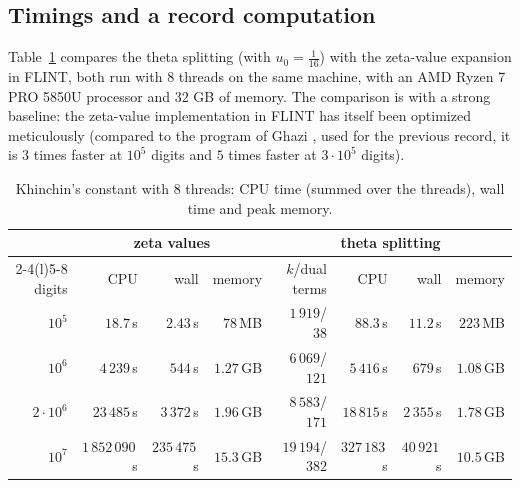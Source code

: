 \documentclass[11pt,reqno]{amsart}
\theoremstyle{definition}
\theoremstyle{remark}
\begin{document}
\subsection{Timings and a record computation}\label{sec:khresults}
Table~\ref{tab:khinchin} compares the theta splitting (with $u_0 = \frac1{16}$) with the zeta-value expansion in FLINT,
both run with $8$ threads on the same machine, with an AMD Ryzen 7 PRO 5850U processor and $32$ GB of memory. The
comparison is with a strong baseline: the zeta-value implementation in FLINT has itself
been optimized meticulously (compared to the program of Ghazi \cite{Gha26}, used for the previous record,
it is $3$ times faster at $10^5$ digits and $5$ times faster at $3\cdot10^5$ digits).
\begin{table}[ht]
\centering\footnotesize
\setlength{\tabcolsep}{3.5pt}
\caption{Khinchin's constant with $8$ threads: CPU time (summed over the threads), wall time and peak memory.}
\label{tab:khinchin}
\begin{tabular}{rrrrrrrr}
\toprule
& \multicolumn{3}{c}{zeta values} & \multicolumn{4}{c}{theta splitting} \\
\cmidrule(lr){2-4}\cmidrule(l){5-8}
digits & CPU & wall & memory & $k$/dual terms & CPU & wall & memory \\
\midrule
$10^5$ & $18.7$\,s & $2.43$\,s & $78$\,MB & $1\,919$/$38$ & $88.3$\,s & $11.2$\,s & $223$\,MB \\
$10^6$ & $4\,239$\,s & $544$\,s & $1.27$\,GB & $6\,069$/$121$ & $5\,416$\,s & $679$\,s & $1.08$\,GB \\
$2\cdot10^6$ & $23\,485$\,s & $3\,372$\,s & $1.96$\,GB & $8\,583$/$171$ & $18\,815$\,s & $2\,355$\,s & $1.78$\,GB \\
$10^7$ & $1\,852\,090$\,s & $235\,475$\,s & $15.3$\,GB & $19\,194$/$382$ & $327\,183$\,s & $40\,921$\,s & $10.5$\,GB \\
\bottomrule
\end{tabular}
\end{table}
\end{document}
